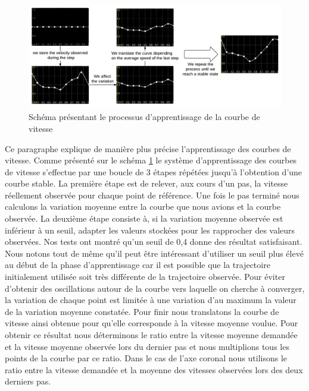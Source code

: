 \documentclass[runningheads,a4paper]{llncs}
\begin{document}
\begin{figure}[h]
\centering
\includegraphics[scale=0.45]{speed_curve_learner.pdf}
\caption{Schéma présentant le processus d'apprentissage de la courbe de vitesse}
\label{fig:speed_curve_learner}
\end{figure}


Ce paragraphe explique de manière plus précise l'apprentissage des courbes de vitesse. Comme présenté sur le schéma \ref{fig:speed_curve_learner} le système d'apprentissage des courbes de vitesse s'effectue par une boucle de 3 étapes répétées jusqu'à l'obtention d'une courbe stable. La première étape est de relever, aux cours d'un pas, la vitesse réellement observée pour chaque point de référence. Une fois le pas terminé nous calculons la variation moyenne entre la courbe que nous avions et la courbe observée. La deuxième étape consiste à, si la variation moyenne observée est inférieur à un seuil, adapter les valeurs stockées pour les rapprocher des valeurs observées. Nos tests ont montré qu'un seuil de 0,4 donne des résultat satisfaisant. Nous notons tout de même qu'il peut être intéressant d'utiliser un seuil plus élevé au début de la phase d'apprentissage car il est possible que la trajectoire initialement utilisée soit très différente de la trajectoire observée.  Pour éviter d'obtenir des oscillations autour de la courbe vers laquelle on cherche à converger, la variation de chaque point est limitée à une variation d'au maximum la valeur de la variation moyenne constatée. Pour finir nous translatons la courbe de vitesse ainsi obtenue pour qu'elle corresponde à la vitesse moyenne voulue. Pour obtenir ce résultat nous déterminons le ratio entre la vitesse moyenne demandée et la vitesse moyenne observée lors du dernier pas et nous multiplions tous les points de la courbe par ce ratio. Dans le cas de l'axe coronal nous utilisons le ratio entre la vitesse demandée et la moyenne des vitesses observées lors des deux derniers pas.
\end{document}
